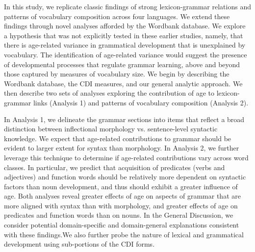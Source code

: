 \documentclass[10pt,letterpaper]{article}
\begin{document}
In this study, we replicate classic findings of strong lexicon-grammar relations and patterns of vocabulary composition across four languages. We extend these findings through novel analyses afforded by the Wordbank database. We explore a hypothesis that was not explicitly tested in these earlier studies, namely, that there is age-related variance in grammatical development that is unexplained by vocabulary. The identification of age-related variance would suggest the presence of developmental processes that regulate grammar learning, above and beyond those captured by measures of vocabulary size.  We begin by describing the Wordbank database, the CDI measures, and our general analytic approach. We then describe two sets of analyses exploring the contribution of age to lexicon-grammar links (Analysis 1) and patterns of vocabulary composition (Analysis 2). 

In Analysis 1, we delineate the grammar sections into items that reflect a broad distinction between inflectional morphology vs. sentence-level syntactic knowledge. We expect that age-related contributions to grammar should be evident to larger extent for syntax than morphology.  In Analysis 2, we further leverage this technique to determine if age-related contributions vary across word classes. In particular, we predict that acquisition of predicates (verbs and adjectives) and function words should be relatively more dependent on syntactic factors than noun development, and thus should exhibit a greater influence of age. Both analyses reveal greater effects of age on aspects of grammar that are more aligned with syntax than with morphology, and greater effects of age on predicates and function words than on nouns. In the General Discussion, we consider potential domain-specific and domain-general explanations consistent with these findings.We also further probe the nature of lexical and grammatical development using sub-portions of the CDI forms. 
 

\end{document}
